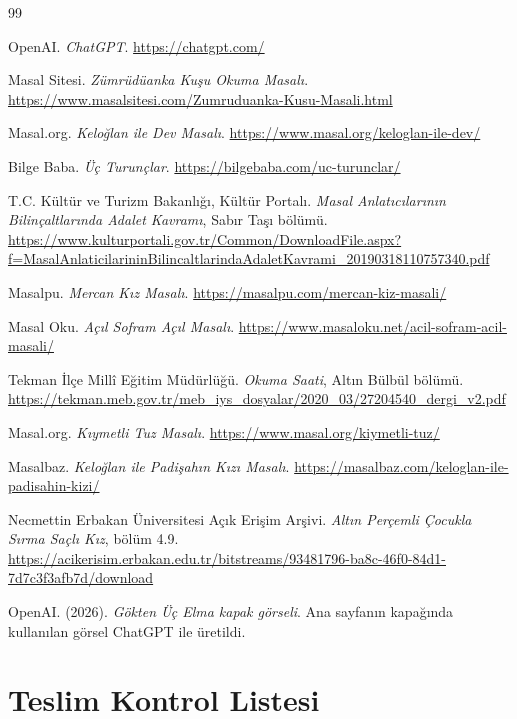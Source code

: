 \documentclass[12pt,a4paper]{article}
\begin{document}
\begin{thebibliography}{99}

OpenAI. \emph{ChatGPT}.
\url{https://chatgpt.com/}

Masal Sitesi. \emph{Zümrüdüanka Kuşu Okuma Masalı}.
\url{https://www.masalsitesi.com/Zumruduanka-Kusu-Masali.html}

Masal.org. \emph{Keloğlan ile Dev Masalı}.
\url{https://www.masal.org/keloglan-ile-dev/}

Bilge Baba. \emph{Üç Turunçlar}.
\url{https://bilgebaba.com/uc-turunclar/}

T.C. Kültür ve Turizm Bakanlığı, Kültür Portalı.
\emph{Masal Anlatıcılarının Bilinçaltlarında Adalet Kavramı}, Sabır Taşı bölümü.
\url{https://www.kulturportali.gov.tr/Common/DownloadFile.aspx?f=MasalAnlaticilarininBilincaltlarindaAdaletKavrami_20190318110757340.pdf}

Masalpu. \emph{Mercan Kız Masalı}.
\url{https://masalpu.com/mercan-kiz-masali/}

Masal Oku. \emph{Açıl Sofram Açıl Masalı}.
\url{https://www.masaloku.net/acil-sofram-acil-masali/}

Tekman İlçe Millî Eğitim Müdürlüğü.
\emph{Okuma Saati}, Altın Bülbül bölümü.
\url{https://tekman.meb.gov.tr/meb_iys_dosyalar/2020_03/27204540_dergi_v2.pdf}

Masal.org. \emph{Kıymetli Tuz Masalı}.
\url{https://www.masal.org/kiymetli-tuz/}

Masalbaz. \emph{Keloğlan ile Padişahın Kızı Masalı}.
\url{https://masalbaz.com/keloglan-ile-padisahin-kizi/}

Necmettin Erbakan Üniversitesi Açık Erişim Arşivi.
\emph{Altın Perçemli Çocukla Sırma Saçlı Kız}, bölüm 4.9.
\url{https://acikerisim.erbakan.edu.tr/bitstreams/93481796-ba8c-46f0-84d1-7d7c3f3afb7d/download}

OpenAI. (2026). \emph{Gökten Üç Elma kapak görseli}.
Ana sayfanın kapağında kullanılan görsel ChatGPT ile üretildi.

\end{thebibliography}

\appendix
\section{Teslim Kontrol Listesi}
\end{document}
